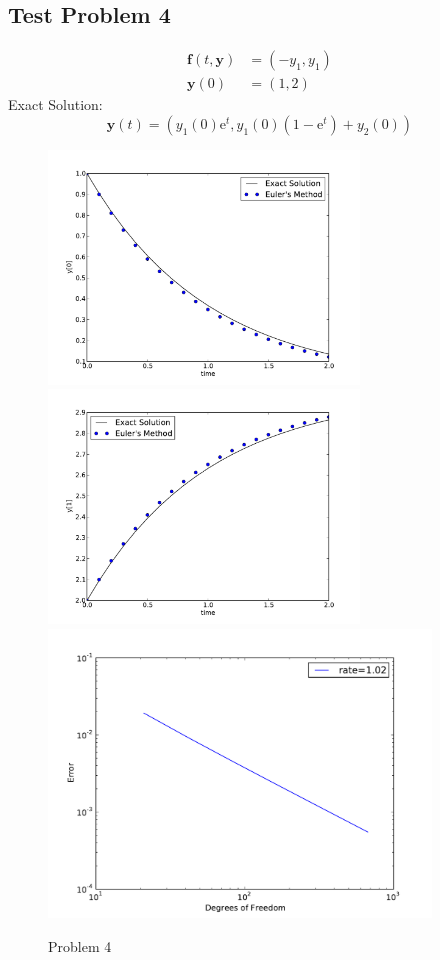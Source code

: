\documentclass[10pt,letterpaper]{article}
\def\e{\mathrm{e}}
\def\y{\mathbf{y}}
\def\f{\mathbf{f}}
\begin{document}
\subsection*{Test Problem 4}
\begin{align*}
\f(t,\y) &= (-y_1,y_1)\\
\y(0) &= (1, 2)
\end{align*}
Exact Solution:
\[
\y(t)=(y_1(0)\e^t, y_1(0)(1-\e^t)+y_2(0))
\]
\begin{figure}[h!]
\centering
\includegraphics[width=3.25in,keepaspectratio=true]{./p4_1.pdf}
\includegraphics[width=3.25in,keepaspectratio=true]{./p4_2.pdf}
\includegraphics[width=4in,keepaspectratio=true]{./p4_3.pdf}
\caption{Problem 4}
\end{figure}
\end{document}

